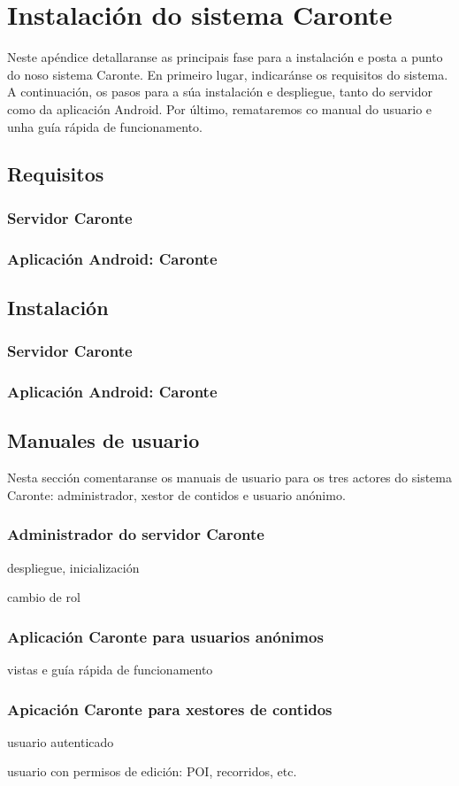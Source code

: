 \chapter{Instalación do sistema Caronte}

Neste apéndice detallaranse as principais fase para a instalación e posta a punto do noso sistema Caronte.
En primeiro lugar, indicaránse os requisitos do sistema. A continuación, os pasos para a súa instalación e despliegue,
tanto do servidor como da aplicación Android.
Por último, remataremos co manual do usuario e unha guía rápida de funcionamento.

\section{Requisitos}

\subsection{Servidor Caronte}
\subsection{Aplicación Android: Caronte}


\section{Instalación}

\subsection{Servidor Caronte}
\subsection{Aplicación Android: Caronte}



\section{Manuales de usuario}

Nesta sección comentaranse os manuais de usuario para os tres actores do sistema Caronte:
administrador, xestor de contidos e usuario anónimo.

\subsection{Administrador do servidor Caronte}
despliegue, inicialización

cambio de rol

\subsection{Aplicación Caronte para usuarios anónimos}

vistas e guía rápida de funcionamento

\subsection{Apicación Caronte para xestores de contidos}

usuario autenticado

usuario con permisos de edición: POI, recorridos, etc.

